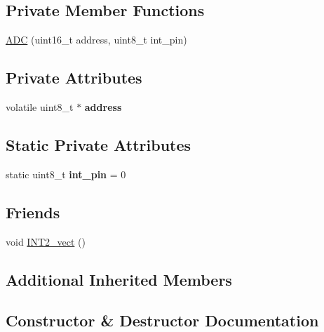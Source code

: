 \subsection*{Private Member Functions}
\begin{DoxyCompactItemize}
\item 
\hyperlink{class_a_d_c_a0818050dee0dd8789966db0f429ef0bd}{A\+DC} (uint16\+\_\+t address, uint8\+\_\+t int\+\_\+pin)
\end{DoxyCompactItemize}
\subsection*{Private Attributes}
\begin{DoxyCompactItemize}
\item 
\hypertarget{class_a_d_c_aa58c27581281db4bd8537df9ea2b49f2}{}\label{class_a_d_c_aa58c27581281db4bd8537df9ea2b49f2} 
volatile uint8\+\_\+t $\ast$ {\bfseries address}
\end{DoxyCompactItemize}
\subsection*{Static Private Attributes}
\begin{DoxyCompactItemize}
\item 
\hypertarget{class_a_d_c_a6e0562436e7b39f0e53435ed5cc393a3}{}\label{class_a_d_c_a6e0562436e7b39f0e53435ed5cc393a3} 
static uint8\+\_\+t {\bfseries int\+\_\+pin} = 0
\end{DoxyCompactItemize}
\subsection*{Friends}
\begin{DoxyCompactItemize}
\item 
void \hyperlink{class_a_d_c_a8f7964aad4550f29972483135452c811}{I\+N\+T2\+\_\+vect} ()
\end{DoxyCompactItemize}
\subsection*{Additional Inherited Members}


\subsection{Constructor \& Destructor Documentation}
\hypertarget{class_a_d_c_a0818050dee0dd8789966db0f429ef0bd}{}\label{class_a_d_c_a0818050dee0dd8789966db0f429ef0bd} 

